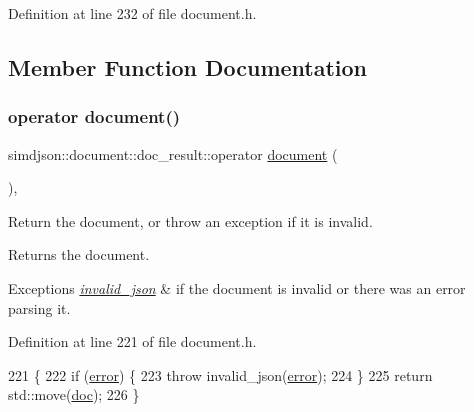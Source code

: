 Definition at line 232 of file document.\+h.



\subsection{Member Function Documentation}
\mbox{\label{classsimdjson_1_1document_1_1doc__result_a4958f62dceafeea28b8b5915871de9d7}} 
\subsubsection{\texorpdfstring{operator document()}{operator document()}}
{\footnotesize\ttfamily simdjson\+::document\+::doc\+\_\+result\+::operator \hyperlink{classsimdjson_1_1document}{document} (\begin{DoxyParamCaption}{ }\end{DoxyParamCaption})\hspace{0.3cm}{\ttfamily [inline]}, {\ttfamily [noexcept]}}



Return the document, or throw an exception if it is invalid. 

\begin{DoxyReturn}{Returns}
the document. 
\end{DoxyReturn}

\begin{DoxyExceptions}{Exceptions}
{\em \hyperlink{structsimdjson_1_1invalid__json}{invalid\+\_\+json}} & if the document is invalid or there was an error parsing it. \\
\hline
\end{DoxyExceptions}


Definition at line 221 of file document.\+h.


\begin{DoxyCode}
221                                                              \{
222   \textcolor{keywordflow}{if} (\hyperlink{classsimdjson_1_1document_1_1doc__result_aed27563b2adca42b5e10416cc1cbe2c7}{error}) \{
223     \textcolor{keywordflow}{throw} invalid\_json(\hyperlink{classsimdjson_1_1document_1_1doc__result_aed27563b2adca42b5e10416cc1cbe2c7}{error});
224   \}
225   \textcolor{keywordflow}{return} std::move(\hyperlink{classsimdjson_1_1document_1_1doc__result_ad12726cc5708b5af4684795344a5fce4}{doc});
226 \}
\end{DoxyCode}


